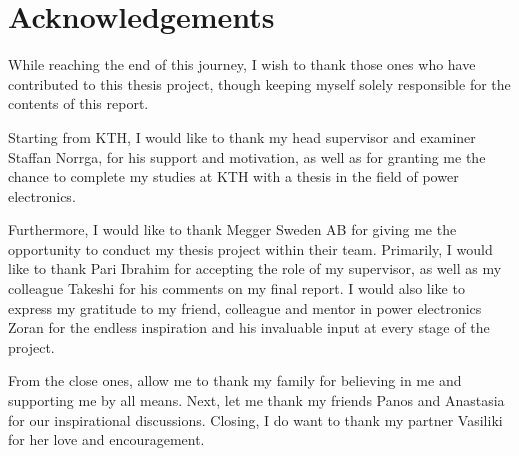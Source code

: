 \section{Acknowledgements}

While reaching the end of this journey, I wish to thank those ones who have contributed to this thesis project, though keeping myself solely responsible for the contents of this report.

Starting from KTH, I would like to thank my head supervisor and examiner Staffan Norrga, for his support and motivation, as well as for granting me the chance to complete my studies at KTH with a thesis in the field of power electronics. 

Furthermore, I would like to thank Megger Sweden AB for giving me the opportunity to conduct my thesis project within their team. Primarily, I would like to thank Pari Ibrahim for accepting the role of my supervisor, as well as my colleague Takeshi for his comments on my final report. I would also like to express my gratitude to my friend, colleague and mentor in power electronics Zoran for the endless inspiration and his invaluable input at every stage of the project.

From the close ones, allow me to thank my family for believing in me and supporting me by all means. Next, let me thank my friends Panos and Anastasia for our inspirational discussions. Closing, I do want to thank my partner Vasiliki for her love and encouragement.
